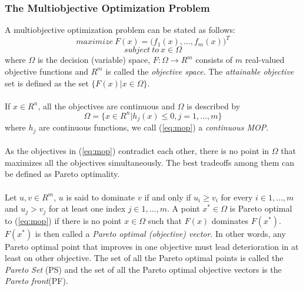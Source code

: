 \documentclass[a4paper, 11pt]{article}
\begin{document}
\subsubsection{The Multiobjective Optimization Problem}
A multiobjective optimization problem can be stated as follows:
\begin{displaymath}
maximize \  F(x)=\big(f_1(x),\ldots,f_m(x)\big)^T
\end{displaymath}
\begin{equation}\label{eq:mop}
subject \  to \  x \in \Omega
\end{equation}
where $\Omega$ is the decision (variable) space, $F:\Omega\rightarrow R^m$ consists of $m$ real-valued objective functions
and $R^m$ is called the \emph{objective space}. The \emph{attainable objective} set is defined as the set $\{F(x)|x\in\Omega\}$.\\
\\
If $x\in R^n$, all the objectives are continuous and $\Omega$ is described by
\begin{displaymath}
\Omega=\{x\in R^n|h_j(x)\le 0, j=1,\ldots,m\}
\end{displaymath}
where $h_j$ are continuous functions, we call (\ref{eq:mop}) a \emph{continuous MOP}.\\
\\
As the objectives in (\ref{eq:mop}) contradict each other, there is no point in $\Omega$ that maximizes all the objectives simultaneously.
The best tradeoffs among them can be defined as Pareto optimality. \\
\\
Let $u, v\in R^m$, $u$ is said to dominate $v$ if and only if $u_i\ge v_i$ for every $i\in {1,\ldots,m}$ and $u_j>v_j$ for at least one index $j\in{1,\ldots,m}$.
A point $x^\ast \in\Omega$ is Pareto optimal to (\ref{eq:mop}) if there is no point $x\in\Omega$ such that $F(x)$ dominates $F(x^\ast)$.
$F(x^\ast)$ is then called a \emph{Pareto optimal (objective) vector}. In other words, any Pareto optimal point that improves in one objective
must lead deterioration in at least on other objective. The set of all the Pareto optimal points is called the \emph{Pareto Set}
(PS) and the set of all the Pareto optimal objective vectors is the \emph{Pareto front}(PF\cite{miettinen1999nonlinear}).

\end{document}
